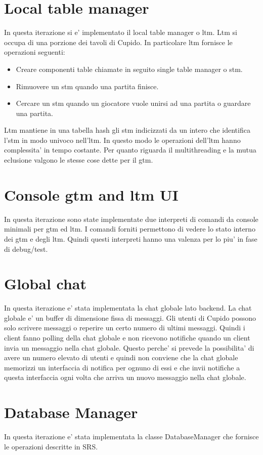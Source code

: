\section{Local table manager}
  In questa iterazione si e' implementato il local table manager o ltm. Ltm si occupa di una porzione dei tavoli di Cupido. In particolare ltm fornisce le operazioni seguenti:
  \begin{itemize}
    \item 
      Creare componenti table chiamate in seguito single table manager o stm.
    \item 
      Rimuovere un stm quando una partita finisce.
    \item 
      Cercare un stm quando un giocatore vuole unirsi ad una partita o guardare una partita.
  \end{itemize}
  Ltm mantiene in una tabella hash gli stm indicizzati da un intero che identifica l'stm in modo univoco nell'ltm. In questo modo le operazioni dell'ltm hanno complessita' in tempo costante.
  Per quanto riguarda il multithreading e la mutua eclusione valgono le stesse cose dette per il gtm.

\section{Console gtm and ltm UI}
  In questa iterazione sono state implementate due interpreti di comandi da console minimali per gtm ed ltm. I comandi forniti permettono di vedere lo stato interno dei gtm e degli ltm. Quindi questi interpreti hanno una valenza per lo piu' in fase di debug/test.

\section{Global chat}
  In questa iterazione e' stata implementata la chat globale lato backend. La chat globale e' un buffer di dimensione fissa di messaggi. Gli utenti di Cupido possono solo scrivere messaggi o reperire un certo numero di ultimi messaggi. Quindi i client fanno polling della chat globale e non ricevono notifiche quando un client invia un messaggio nella chat globale. Questo perche' si prevede la possibilita' di avere un numero elevato di utenti e quindi non conviene che la chat globale memorizzi un interfaccia di notifica per ognuno di essi e che invii notifiche a questa interfaccia ogni volta che arriva un nuovo messaggio nella chat globale.

\section{Database Manager}
  In questa iterazione e' stata implementata la classe DatabaseManager che fornisce le operazioni descritte in SRS.


